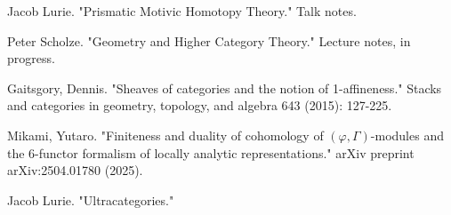 \documentclass[12pt]{article}
\theoremstyle{definition}
\begin{document}
\begin{thebibliography}{}
 Jacob Lurie. "Prismatic Motivic Homotopy Theory." Talk notes.

 Peter Scholze. "Geometry and Higher Category Theory." Lecture notes, in progress.

 Gaitsgory, Dennis. "Sheaves of categories and the notion of 1-affineness." Stacks and categories in geometry, topology, and algebra 643 (2015): 127-225. 

 Mikami, Yutaro. "Finiteness and duality of cohomology of $(\varphi,\Gamma) $-modules and the 6-functor formalism of locally analytic representations." arXiv preprint arXiv:2504.01780 (2025). 

 Jacob Lurie. "Ultracategories."







\end{thebibliography}
\end{document}
